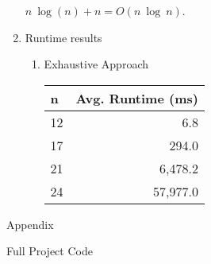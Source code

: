 \documentclass[12pt]{article}
\begin{document}
\begin{enumerate}
\begin{center}
    $n\ \log(n) + n = O(n\ \log\ n)$.
\end{center}
\pagebreak
\item Runtime results
    \begin{enumerate}
        \item Exhaustive Approach

            \begin{tabular}{ |l |r |}
                \hline
                \textbf{n} & \textbf{Avg. Runtime (ms)} \\
                \hline
                12 & 6.8 \\
                17 & 294.0 \\
                21 & 6,478.2 \\
                24 & 57,977.0 \\
                \hline
            \end{tabular}
    \end{enumerate}

\end{enumerate}
\pagebreak
{\bf
\begin{center}
    Appendix
\end{center}
Full Project Code
}
\end{document}
